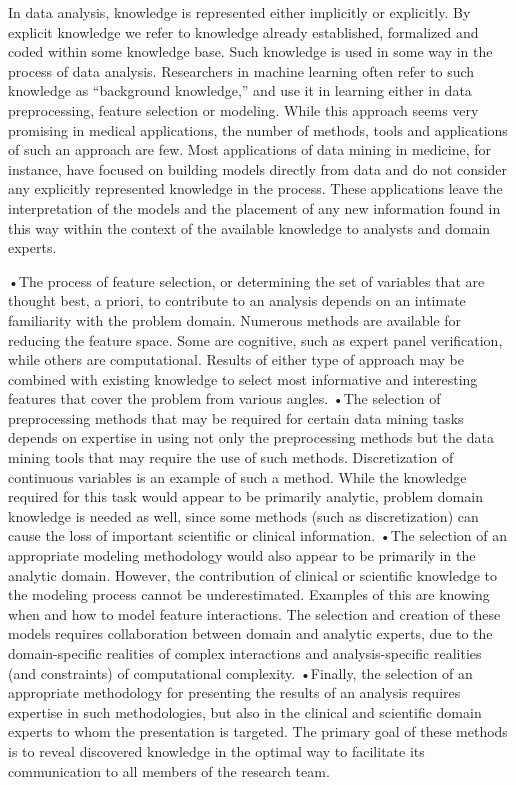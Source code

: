 \documentclass[10pt,a4paper]{article}
\begin{document}
	In data analysis, knowledge is represented either implicitly or explicitly. By explicit knowledge we refer to knowledge already established, formalized and coded within some knowledge base. Such knowledge is used in some way in the process of data analysis. Researchers in machine learning often refer to such knowledge as “background knowledge,” and use it in learning either in data preprocessing, feature selection or modeling. While this approach seems very promising in medical applications, the number of methods, tools and applications of such an approach are few. Most applications of data mining in medicine, for instance, have focused on building models directly from data and do not consider any explicitly represented knowledge in the process. These applications leave the interpretation of the models and the placement of any new information found in this way within the context of the available knowledge to analysts and domain experts. \cite{zupan2006knowledge}
	
	•The process of feature selection, or determining the set of variables that are thought best, a priori, to contribute to an analysis depends on an intimate familiarity with the problem domain. Numerous methods are available for reducing the feature space. Some are cognitive, such as expert panel verification, while others are computational. Results of either type of approach may be combined with existing knowledge to select most informative and interesting features that cover the problem from various angles.
	•The selection of preprocessing methods that may be required for certain data mining tasks depends on expertise in using not only the preprocessing methods but the data mining tools that may require the use of such methods. Discretization of continuous variables is an example of such a method. While the knowledge required for this task would appear to be primarily analytic, problem domain knowledge is needed as well, since some methods (such as discretization) can cause the loss of important scientific or clinical information.
	•The selection of an appropriate modeling methodology would also appear to be primarily in the analytic domain. However, the contribution of clinical or scientific knowledge to the modeling process cannot be underestimated. Examples of this are knowing when and how to model feature interactions. The selection and creation of these models requires collaboration between domain and analytic experts, due to the domain-specific realities of complex interactions and analysis-specific realities (and constraints) of computational complexity.
	•Finally, the selection of an appropriate methodology for presenting the results of an analysis requires expertise in such methodologies, but also in the clinical and scientific domain experts to whom the presentation is targeted. The primary goal of these methods is to reveal discovered knowledge in the optimal way to facilitate its communication to all members of the research team.\cite{zupan2006knowledge}
	
\end{document}
